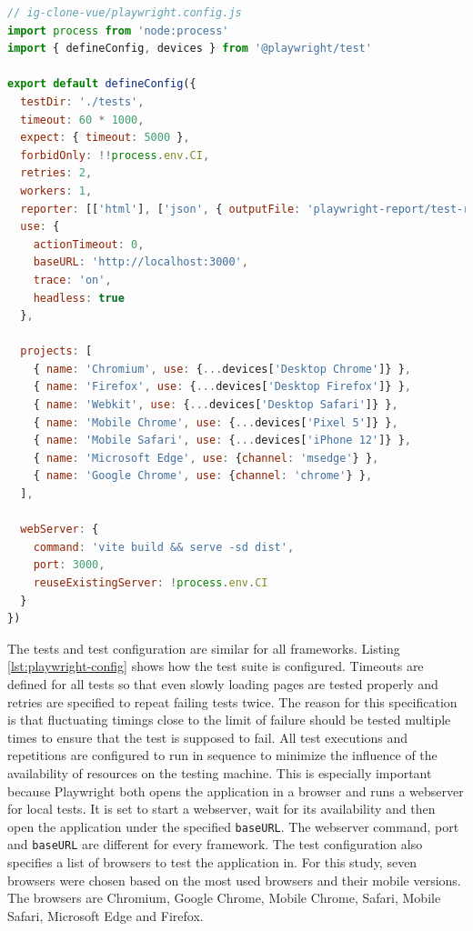 \documentclass[a4paper, 10pt]{article}
\begin{document}
\begin{lstlisting}[caption={Playwright configuration for Vue.js}, label={lst:playwright-config}, language=JavaScript]
// ig-clone-vue/playwright.config.js
import process from 'node:process'
import { defineConfig, devices } from '@playwright/test'

export default defineConfig({
  testDir: './tests',
  timeout: 60 * 1000,
  expect: { timeout: 5000 },
  forbidOnly: !!process.env.CI,
  retries: 2,
  workers: 1,
  reporter: [['html'], ['json', { outputFile: 'playwright-report/test-results.json' }]],
  use: {
    actionTimeout: 0,
    baseURL: 'http://localhost:3000',
    trace: 'on',
    headless: true
  },

  projects: [
    { name: 'Chromium', use: {...devices['Desktop Chrome']} },
    { name: 'Firefox', use: {...devices['Desktop Firefox']} },
    { name: 'Webkit', use: {...devices['Desktop Safari']} },
    { name: 'Mobile Chrome', use: {...devices['Pixel 5']} },
    { name: 'Mobile Safari', use: {...devices['iPhone 12']} },
    { name: 'Microsoft Edge', use: {channel: 'msedge'} },
    { name: 'Google Chrome', use: {channel: 'chrome'} },
  ],

  webServer: {
    command: 'vite build && serve -sd dist',
    port: 3000,
    reuseExistingServer: !process.env.CI
  }
})

\end{lstlisting}

The tests and test configuration are similar for all frameworks.
Listing \ref{lst:playwright-config} shows how the test suite is configured.
Timeouts are defined for all tests so that even slowly loading pages are tested properly and retries are specified to repeat failing tests twice.
The reason for this specification is that fluctuating timings close to the limit of failure should be tested multiple times to ensure that the test is supposed to fail.
All test executions and repetitions are configured to run in sequence to minimize the influence of the availability of resources on the testing machine.
This is especially important because Playwright both opens the application in a browser and runs a webserver for local tests.
It is set to start a webserver, wait for its availability and then open the application under the specified \verb|baseURL|.
The webserver command, port and \verb|baseURL| are different for every framework.
The test configuration also specifies a list of browsers to test the application in.
For this study, seven browsers were chosen based on the most used browsers \citep{browserUsage} and their mobile versions.
The browsers are Chromium, Google Chrome, Mobile Chrome, Safari, Mobile Safari, Microsoft Edge and Firefox.
\end{document}

